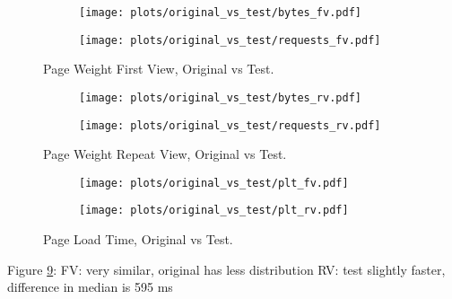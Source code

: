 \begin{figure}
	\centering
	\begin{subfigure}{.5\textwidth}
		\centering
		\texttt{[image: plots/original\_vs\_test/bytes\_fv.pdf]}
		\label{fig:sub1}
	\end{subfigure}%
	\begin{subfigure}{.5\textwidth}
		\centering
		\texttt{[image: plots/original\_vs\_test/requests\_fv.pdf]}
		\label{fig:sub2}
	\end{subfigure}
	\caption{Page Weight First View, Original vs Test.}
	\label{figure:plt_original_test}
\end{figure}


\begin{figure}
	\centering
	\begin{subfigure}{.5\textwidth}
		\centering
		\texttt{[image: plots/original\_vs\_test/bytes\_rv.pdf]}
		\label{fig:sub1}
	\end{subfigure}%
	\begin{subfigure}{.5\textwidth}
		\centering
		\texttt{[image: plots/original\_vs\_test/requests\_rv.pdf]}
		\label{fig:sub2}
	\end{subfigure}
	\caption{Page Weight Repeat View, Original vs Test.}
	\label{figure:plt_original_test}
\end{figure}



\clearpage


\begin{figure}
	\centering
	\begin{subfigure}{.5\textwidth}
		\centering
		\texttt{[image: plots/original\_vs\_test/plt\_fv.pdf]}
		\label{fig:sub1}
	\end{subfigure}%
	\begin{subfigure}{.5\textwidth}
		\centering
		\texttt{[image: plots/original\_vs\_test/plt\_rv.pdf]}
		\label{fig:sub2}
	\end{subfigure}
	\caption{Page Load Time, Original vs Test.}
	\label{figure:plt_original_test}
\end{figure}

Figure \ref{figure:plt_original_test}:
FV: very similar, original has less distribution
RV: test slightly faster, difference in median is 595 ms 

